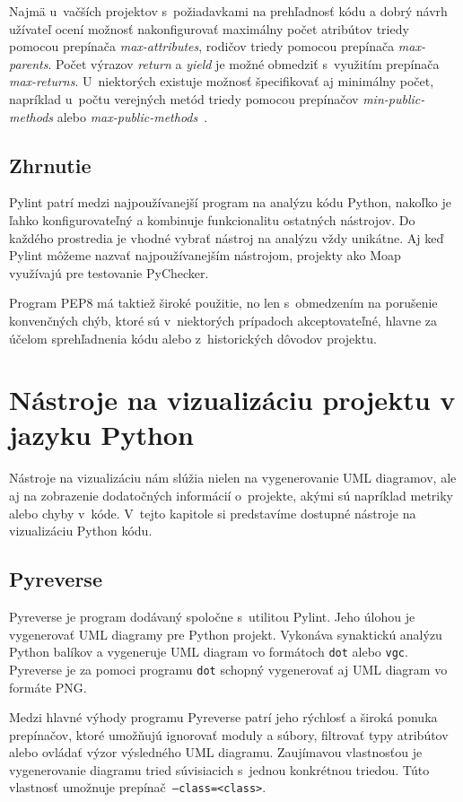 \documentclass[11pt,oneside,final]{fithesis2}
\begin{document}
    Najmä u~vačších projektov s~požiadavkami na prehľadnosť kódu a dobrý návrh užívateľ ocení možnosť nakonfigurovať maximálny počet atribútov triedy pomocou prepínača \textit{max-attributes}, rodičov triedy pomocou prepínača \textit{max-parents}. Počet výrazov \textit{return} a \textit{yield} je možné obmedziť s~využitím prepínača \textit{max-returns}. U~niektorých existuje možnosť špecifikovať aj minimálny počet, napríklad u~počtu verejných metód triedy pomocou prepínačov \textit{min-public-methods} alebo \textit{max-public-methods}~\cite{pylintfeatures}.
    
\subsection{Zhrnutie}
Pylint patrí medzi najpoužívanejší program na analýzu kódu Python, nakoľko je ľahko konfigurovateľný a kombinuje funkcionalitu ostatných nástrojov. Do každého prostredia je vhodné vybrať nástroj na analýzu vždy unikátne. Aj keď Pylint môžeme nazvať najpoužívanejším nástrojom, projekty ako Moap~\cite{moap} využívajú pre testovanie PyChecker.
    
    Program PEP8 má taktiež široké použitie, no len s~obmedzením na porušenie konvenčných chýb, ktoré  sú v~niektorých prípadoch akceptovateľné, hlavne za účelom sprehľadnenia kódu alebo z~historických dôvodov projektu.
    	
	
	\section{Nástroje na vizualizáciu projektu v jazyku Python}
		
	Nástroje na vizualizáciu nám slúžia nielen na vygenerovanie UML diagramov, ale aj na zobrazenie dodatočných informácií o~projekte, akými sú napríklad metriky alebo chyby v~kóde. V~tejto kapitole si predstavíme dostupné nástroje na vizualizáciu Python kódu.
	
	\subsection{Pyreverse}
		Pyreverse je program dodávaný spoločne s~utilitou Pylint. Jeho úlohou je vygenerovať UML diagramy pre Python projekt. Vykonáva synaktickú analýzu Python balíkov a vygeneruje UML diagram vo formátoch \texttt{dot} alebo \texttt{vgc}. Pyreverse je za pomoci programu \texttt{dot} schopný vygenerovať aj UML diagram vo formáte PNG.
		
		Medzi hlavné výhody programu Pyreverse patrí jeho rýchlosť a široká ponuka prepínačov, ktoré umožňujú ignorovať moduly a súbory, filtrovať typy atribútov alebo ovládať výzor výsledného UML diagramu.		
		Zaujímavou vlastnosťou je vygenerovanie diagramu tried súvisiacich s~jednou konkrétnou triedou. Túto vlastnosť umožnuje prepínač\texttt{ --class=<class>}.
		
\end{document}
